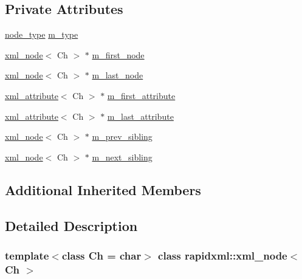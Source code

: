 \subsection*{Private Attributes}
\begin{DoxyCompactItemize}
\item 
\mbox{\hyperlink{namespacerapidxml_abb456db38f7efb746c4330eed6072a7c}{node\+\_\+type}} \mbox{\hyperlink{classrapidxml_1_1xml__node_a33912a5ceef221d662bbac67c70e1397}{m\+\_\+type}}
\item 
\mbox{\hyperlink{classrapidxml_1_1xml__node}{xml\+\_\+node}}$<$ Ch $>$ $\ast$ \mbox{\hyperlink{classrapidxml_1_1xml__node_a3c2a0b286724865b5c000e3333f60d4a}{m\+\_\+first\+\_\+node}}
\item 
\mbox{\hyperlink{classrapidxml_1_1xml__node}{xml\+\_\+node}}$<$ Ch $>$ $\ast$ \mbox{\hyperlink{classrapidxml_1_1xml__node_adc211d26cfea2ba6fb51adb27694ff09}{m\+\_\+last\+\_\+node}}
\item 
\mbox{\hyperlink{classrapidxml_1_1xml__attribute}{xml\+\_\+attribute}}$<$ Ch $>$ $\ast$ \mbox{\hyperlink{classrapidxml_1_1xml__node_a5f7caf8d72d8fae634be6eb744ad8538}{m\+\_\+first\+\_\+attribute}}
\item 
\mbox{\hyperlink{classrapidxml_1_1xml__attribute}{xml\+\_\+attribute}}$<$ Ch $>$ $\ast$ \mbox{\hyperlink{classrapidxml_1_1xml__node_ad82c1bdd1a5c94927cf8a627f18953b9}{m\+\_\+last\+\_\+attribute}}
\item 
\mbox{\hyperlink{classrapidxml_1_1xml__node}{xml\+\_\+node}}$<$ Ch $>$ $\ast$ \mbox{\hyperlink{classrapidxml_1_1xml__node_a571f24c86107f8442f46a514a7cc5d0d}{m\+\_\+prev\+\_\+sibling}}
\item 
\mbox{\hyperlink{classrapidxml_1_1xml__node}{xml\+\_\+node}}$<$ Ch $>$ $\ast$ \mbox{\hyperlink{classrapidxml_1_1xml__node_a202e84dfdd34cb65557b64e31b7e205a}{m\+\_\+next\+\_\+sibling}}
\end{DoxyCompactItemize}
\subsection*{Additional Inherited Members}


\subsection{Detailed Description}
\subsubsection*{template$<$class Ch = char$>$\newline
class rapidxml\+::xml\+\_\+node$<$ Ch $>$}

